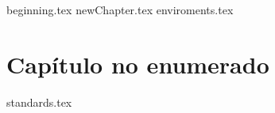 \documentclass[11pt, oneside]{book}
\begin{document}
	\getcover
	\frontmatter
		{beginning.tex}
		\tableofcontents
	\mainmatter
	{newChapter.tex}\cleanalldata
	{enviroments.tex}\cleanalldata
	\chapter*{Capítulo no enumerado}
	\appendix
		{standards.tex}\cleanalldata
%	
%	
\end{document}
